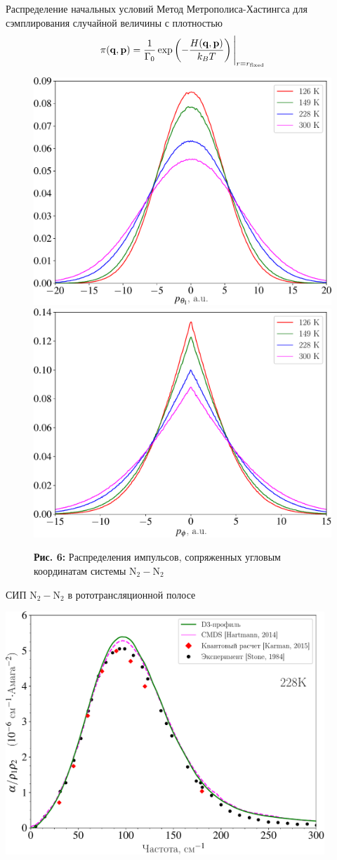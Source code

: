 \documentclass[10pt,usenames,pdf,hyperref={unicode},dvipsnames]{beamer}
\newcommand{\lb}{\left(}
\newcommand{\rb}{\right)}
\newcommand{\mf}{\mathbf}
\newcommand{\mycaption}[2]{
    \textbf{#1:} #2
}
\begin{document}
\begin{frame}{Распределение начальных условий}
    \vspace*{-0.1cm}
	Метод Метрополиса-Хастингса для сэмплирования случайной величины с плотностью  
    \vspace*{-0.1cm}
    \begin{gather}
        \pi(\mf{q}, \mf{p}) = \frac{1}{\Gamma_0} \exp \lb -\frac{H(\mf{q}, \mf{p})}{k_B T} \rb \Bigg{|}_{r = r_\text{fixed}} \notag
    \end{gather}

    \vspace*{-0.5cm}
    \begin{figure}[H]
        \includegraphics[width=0.49\linewidth]{./pictures/pTheta1-crop.pdf}
        \includegraphics[width=0.49\linewidth]{./pictures/pPhi-crop.pdf}
        \mycaption{Рис. 6}{Распределения импульсов, сопряженных угловым координатам системы N$_2-$N$_2$}
    \end{figure}
\end{frame}


\begin{frame}{СИП N$_2-$N$_2$ в рототрансляционной полосе}
	\begin{center}
		\includegraphics[width=0.9\textwidth]{./pictures/228K_russian_legend-crop.pdf}
	\end{center}
\end{frame}
\end{document}
